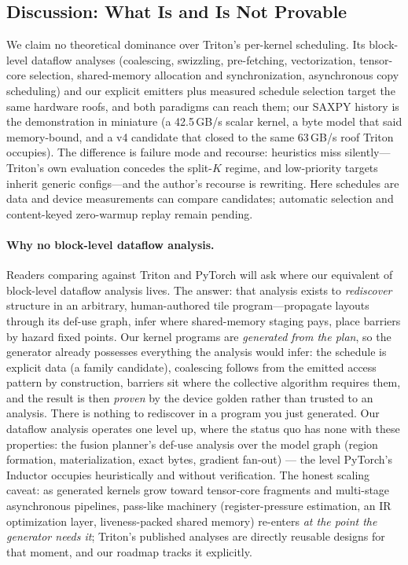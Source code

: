 \documentclass[11pt]{article}
\begin{document}
\subsection{Discussion: What Is and Is Not Provable}\label{sec:theory}
We claim no theoretical dominance over Triton's per-kernel scheduling.
Its block-level dataflow analyses (coalescing, swizzling, pre-fetching,
vectorization, tensor-core selection, shared-memory allocation and
synchronization, asynchronous copy scheduling) and our explicit emitters
plus measured schedule selection target the same hardware roofs, and both
paradigms can reach them; our SAXPY history is the demonstration in
miniature (a 42.5\,GB/s scalar kernel, a byte model that said
memory-bound, and a v4 candidate that closed to the same 63\,GB/s roof
Triton occupies). The difference is failure mode and recourse: heuristics
miss silently---Triton's own evaluation concedes the split-$K$ regime,
and low-priority targets inherit generic configs---and the author's
recourse is rewriting. Here schedules are data and device measurements can
compare candidates; automatic selection and content-keyed zero-warmup replay
remain pending.

\paragraph{Why no block-level dataflow analysis.} Readers comparing
against Triton and PyTorch will ask where our equivalent of block-level
dataflow analysis lives. The answer: that analysis exists to
\emph{rediscover} structure in an arbitrary, human-authored tile
program---propagate layouts through its def-use graph, infer where
shared-memory staging pays, place barriers by hazard fixed points. Our
kernel programs are \emph{generated from the plan}, so the generator
already possesses everything the analysis would infer: the schedule is
explicit data (a family candidate), coalescing follows from the emitted
access pattern by construction, barriers sit where the collective
algorithm requires them, and the result is then \emph{proven} by the
device golden rather than trusted to an analysis. There is nothing to
rediscover in a program you just generated. Our dataflow analysis
operates one level up, where the status quo has none with these
properties: the fusion planner's def-use analysis over the model graph
(region formation, materialization, exact bytes, gradient fan-out) ---
the level PyTorch's Inductor occupies heuristically and without
verification. The honest scaling caveat: as generated kernels grow
toward tensor-core fragments and multi-stage asynchronous pipelines,
pass-like machinery (register-pressure estimation, an IR optimization
layer, liveness-packed shared memory) re-enters \emph{at the point the
generator needs it}; Triton's published analyses are directly reusable
designs for that moment, and our roadmap tracks it explicitly.
\end{document}
